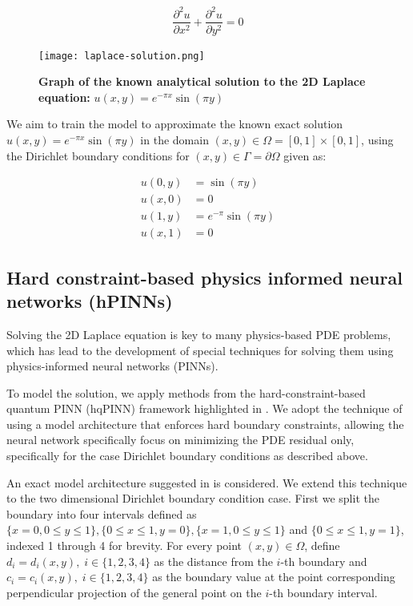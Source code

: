 \documentclass[11pt,a4paper]{article}
\begin{document}
{$$
\frac{\partial ^2 u}{\partial x^2} + \frac{\partial ^2 u}{\partial y^2} = 0
$$

\begin{figure}[H]
    \centering
    \texttt{[image: laplace-solution.png]}
    \caption{\justifying\textbf{Graph of the known analytical solution to the 2D Laplace equation:} $u(x,y) = e^{- \pi x} \sin(\pi y)$}
    \label{fig:laplace-solution}
\end{figure}

We aim to train the model to approximate the known exact solution $u(x,y) = e^{-\pi x} \sin(\pi y)$ in the domain $(x, y) \in \Omega = [0, 1] \times [0, 1]$, using the Dirichlet boundary conditions for $(x, y) \in \Gamma = \partial\Omega$ given as:

\begin{align*}
    u(0,y) &= \sin(\pi y) \\
    u(x,0) &= 0 \\
    u(1,y) &= e^{-\pi} \sin(\pi y) \\
    u(x,1) &= 0
\end{align*}

\subsection{Hard constraint-based physics informed neural networks (hPINNs)} 

Solving the 2D Laplace equation is key to many physics-based PDE problems, which has lead to the development of special techniques for solving them using physics-informed neural networks (PINNs).

To model the solution, we apply methods from the hard-constraint-based quantum PINN (hqPINN) framework highlighted in \cite{PINN}. We adopt the technique of using a model architecture that enforces hard boundary constraints, allowing the neural network specifically focus on minimizing the PDE residual only, specifically for the case Dirichlet boundary conditions as described above.

An exact model architecture suggested in \cite[p.~5]{HQNN} is considered. We extend this technique to the two dimensional Dirichlet boundary condition case. First we split the boundary into four intervals defined as $\{x = 0, 0\leq y\leq 1\}, \{0\leq x \leq 1, y = 0\}, \{x = 1, 0\leq y\leq 1\}$ and  $\{0\leq x \leq 1, y =1\}$, indexed 1 through 4 for brevity. For every point $(x,y) \in \Omega$, define $d_i = d_i(x,y), \;i \in \{1,2,3,4\}$ as the distance from the $i$-th boundary and $c_i = c_i(x,y), \; i \in \{1,2,3,4\}$ as the boundary value at the point corresponding perpendicular projection of the general point on the $i$-th boundary interval.

}
\end{document}
